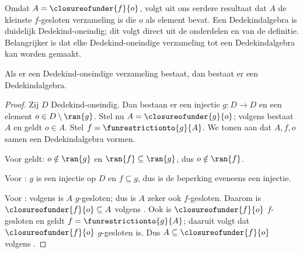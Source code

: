 \documentclass[../../../include/open-logic-section]{subfiles}
\begin{document}
Omdat $A = \closureofunder{f}{o}$, volgt uit ons eerdere resultaat dat
$A$ de kleinste $f$-gesloten verzameling is die $o$ als element bevat.
Een Dedekindalgebra is duidelijk Dedekind-oneindig; dit volgt direct
uit de onderdelen  en  van de
definitie. Belangrijker is dat elke Dedekind-oneindige verzameling tot
een Dedekindalgebra kan worden gemaakt.

\begin{thm}
Als er een Dedekind-oneindige verzameling bestaat, dan bestaat er een
Dedekindalgebra.
\end{thm}

\begin{proof}
Zij $D$ Dedekind-oneindig. Dan bestaan er een injectie $g \colon D \to
D$ en een element $o \in D \setminus \ran{g}$. Stel nu $A =
\closureofunder{g}{o}$; volgens  bestaat $A$
en geldt $o \in A$. Stel $f = \funrestrictionto{g}{A}$. We tonen aan
dat $A, f, o$ samen een Dedekindalgebra vormen.

Voor  geldt: $o \notin \ran{g}$ en $\ran{f}
\subseteq \ran{g}$, dus $o\notin \ran{f}$.

Voor : $g$ is een injectie op $D$ en $f
\subseteq g$, dus is de beperking eveneens een injectie.

Voor : volgens  is $A$
$g$-gesloten; dus is $A$ zeker ook $f$-gesloten. Daarom is
$\closureofunder{f}{o} \subseteq A$ volgens
. Ook is $\closureofunder{f}{o}$
$f$-gesloten en geldt $f = \funrestrictionto{g}{A}$; daaruit volgt dat
$\closureofunder{f}{o}$ $g$-gesloten is. Dus
$A \subseteq \closureofunder{f}{o}$ volgens
.
\end{proof}
\end{document}
